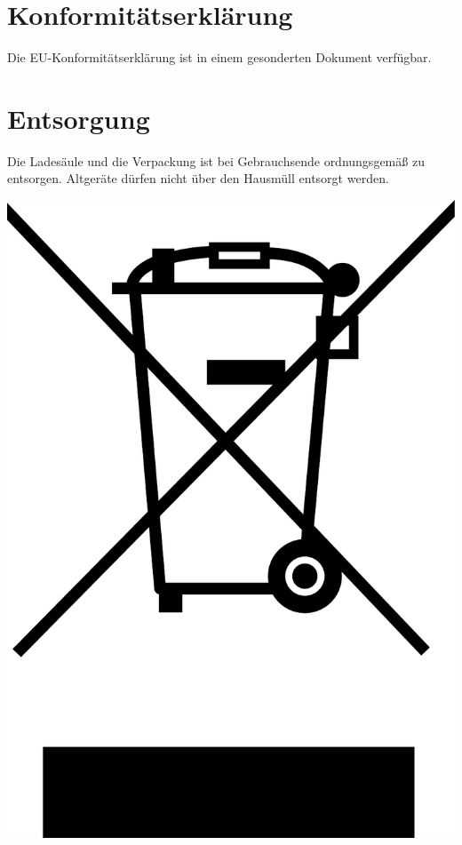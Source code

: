 \documentclass[a4paper,10pt]{article}
\begin{document}
\begin{multicols*}{2}
	\section{Konformitätserklärung}
	Die EU-Konformitätserklärung ist in einem gesonderten Dokument verfügbar.

	\section{Entsorgung}
	\begin{minipage}{0.35\textwidth}
		Die Ladesäule und die Verpackung ist bei Gebrauchsende ordnungsgemäß zu
		entsorgen. Altgeräte dürfen nicht über den Hausmüll entsorgt werden.
	\end{minipage}\hfill
	\begin{minipage}{0.1\textwidth}
		\includegraphics[width=\linewidth]{./img/weee.pdf}
	\end{minipage}



\end{multicols*}
\end{document}
